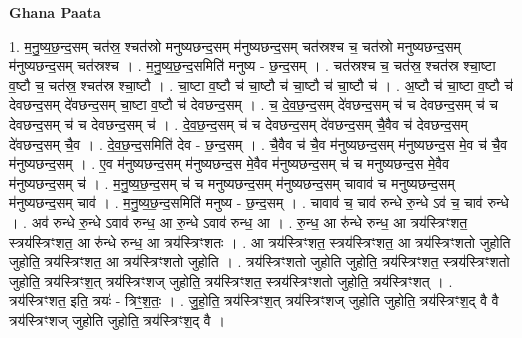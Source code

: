 \documentclass[17pt]{extarticle}
\begin{document}
\textbf{Ghana Paata } \newline

1. म॒नु॒ष्य॒छ॒न्द॒सम् चत॑स्र॒ श्चत॑स्रो मनुष्यछन्द॒सम् म॑नुष्यछन्द॒सम् चत॑स्रश्च च॒ चत॑स्रो मनुष्यछन्द॒सम् म॑नुष्यछन्द॒सम् चत॑स्रश्च । . म॒नु॒ष्य॒छ॒न्द॒समिति॑ मनुष्य - छ॒न्द॒सम् । . चत॑स्रश्च च॒ चत॑स्र॒ श्चत॑स्र श्चा॒ष्टा व॒ष्टौ च॒ चत॑स्र॒ श्चत॑स्र श्चा॒ष्टौ । . चा॒ष्टा व॒ष्टौ च॑ चा॒ष्टौ च॑ चा॒ष्टौ च॑ चा॒ष्टौ च॑ । . अ॒ष्टौ च॑ चा॒ष्टा व॒ष्टौ च॑ देवछन्द॒सम् दे॑वछन्द॒सम् चा॒ष्टा व॒ष्टौ च॑ देवछन्द॒सम् । . च॒ दे॒व॒छ॒न्द॒सम् दे॑वछन्द॒सम् च॑ च देवछन्द॒सम् च॑ च देवछन्द॒सम् च॑ च देवछन्द॒सम् च॑ । . दे॒व॒छ॒न्द॒सम् च॑ च देवछन्द॒सम् दे॑वछन्द॒सम् चै॒वैव च॑ देवछन्द॒सम् दे॑वछन्द॒सम् चै॒व । . दे॒व॒छ॒न्द॒समिति॑ देव - छ॒न्द॒सम् । . चै॒वैव च॑ चै॒व म॑नुष्यछन्द॒सम् म॑नुष्यछन्द॒स मे॒व च॑ चै॒व म॑नुष्यछन्द॒सम् । . ए॒व म॑नुष्यछन्द॒सम् म॑नुष्यछन्द॒स मे॒वैव म॑नुष्यछन्द॒सम् च॑ च मनुष्यछन्द॒स मे॒वैव म॑नुष्यछन्द॒सम् च॑ । . म॒नु॒ष्य॒छ॒न्द॒सम् च॑ च मनुष्यछन्द॒सम् म॑नुष्यछन्द॒सम् चावाव॑ च मनुष्यछन्द॒सम् म॑नुष्यछन्द॒सम् चाव॑ । . म॒नु॒ष्य॒छ॒न्द॒समिति॑ मनुष्य - छ॒न्द॒सम् । . चावाव॑ च॒ चाव॑ रुन्धे रु॒न्धे ऽव॑ च॒ चाव॑ रुन्धे । . अव॑ रुन्धे रु॒न्धे ऽवाव॑ रुन्ध॒ आ रु॒न्धे ऽवाव॑ रुन्ध॒ आ । . रु॒न्ध॒ आ रु॑न्धे रुन्ध॒ आ त्रय॑स्त्रिꣳशत॒ स्त्रय॑स्त्रिꣳशत॒ आ रु॑न्धे रुन्ध॒ आ त्रय॑स्त्रिꣳशतः । . आ त्रय॑स्त्रिꣳशत॒ स्त्रय॑स्त्रिꣳशत॒ आ त्रय॑स्त्रिꣳशतो जुहोति जुहोति॒ त्रय॑स्त्रिꣳशत॒ आ त्रय॑स्त्रिꣳशतो जुहोति । . त्रय॑स्त्रिꣳशतो जुहोति जुहोति॒ त्रय॑स्त्रिꣳशत॒ स्त्रय॑स्त्रिꣳशतो जुहोति॒ त्रय॑स्त्रिꣳश॒त् त्रय॑स्त्रिꣳशज् जुहोति॒ त्रय॑स्त्रिꣳशत॒ स्त्रय॑स्त्रिꣳशतो जुहोति॒ त्रय॑स्त्रिꣳशत् । . त्रय॑स्त्रिꣳशत॒ इति॒ त्रयः॑ - त्रिꣳ॒॒श॒तः॒ । . जु॒हो॒ति॒ त्रय॑स्त्रिꣳश॒त् त्रय॑स्त्रिꣳशज् जुहोति जुहोति॒ त्रय॑स्त्रिꣳश॒द् वै वै त्रय॑स्त्रिꣳशज् जुहोति जुहोति॒ त्रय॑स्त्रिꣳश॒द् वै । \newline
\end{document}
